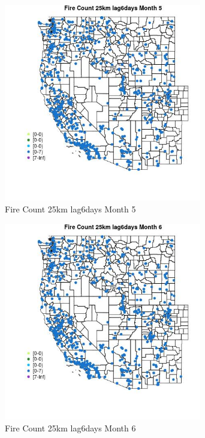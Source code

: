 \begin{figure} 
\centering  
\includegraphics[width=0.77\textwidth]{Code_Outputs/Report_ML_input_PM25_Step4_part_e_de_duplicated_aves_compiled_2019-05-21wNAs_MapObsMo5Fire_Count_25km_lag6days.jpg} 
\caption{\label{fig:Report_ML_input_PM25_Step4_part_e_de_duplicated_aves_compiled_2019-05-21wNAsMapObsMo5Fire_Count_25km_lag6days}Fire Count 25km lag6days Month 5} 
\end{figure} 
 

\begin{figure} 
\centering  
\includegraphics[width=0.77\textwidth]{Code_Outputs/Report_ML_input_PM25_Step4_part_e_de_duplicated_aves_compiled_2019-05-21wNAs_MapObsMo6Fire_Count_25km_lag6days.jpg} 
\caption{\label{fig:Report_ML_input_PM25_Step4_part_e_de_duplicated_aves_compiled_2019-05-21wNAsMapObsMo6Fire_Count_25km_lag6days}Fire Count 25km lag6days Month 6} 
\end{figure} 
 

